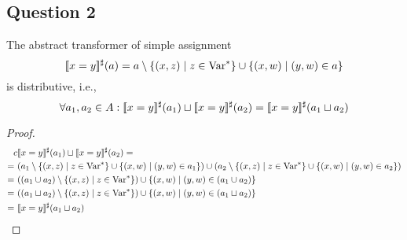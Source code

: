 \subsection{Question 2}
The abstract transformer of simple assignment
\begin{equation*}
	[\![x=y]\!]^\sharp(a) = a \setminus \{(x,z) \mid z\in \text{Var}^*\}\cup\{(x,w)\mid(y,w)\in a\}
\end{equation*}
is distributive, i.e.,
\begin{equation*}
	\forall a_1,a_2\in A: [\![x=y]\!]^\sharp(a_1)\sqcup[\![x=y]\!]^\sharp(a_2)=[\![x=y]\!]^\sharp(a_1\sqcup a_2)
\end{equation*}
\begin{proof}
\begin{align*}
c & [\![x=y]\!]^\sharp(a_1)\sqcup[\![x=y]\!]^\sharp(a_2) = \\
= \ &(a_1 \setminus \{(x,z)\mid z \in \text{Var}^*\}\cup \{(x,w)\mid(y,w)\in a_1\}) \cup (a_2 \setminus \{(x,z)\mid z \in \text{Var}^*\}\cup \{(x,w)\mid(y,w)\in a_2\}) \\
= \ &((a_1 \cup a_2) \setminus \{(x,z)\mid z \in \text{Var}^*\}) \cup \{(x,w)\mid (y,w) \in (a_1 \cup a_2)\} \\
= \ &((a_1 \sqcup a_2) \setminus \{(x,z)\mid z \in \text{Var}^*\}) \cup \{(x,w)\mid (y,w) \in (a_1 \sqcup a_2)\} \\
= \ &[\![x=y]\!]^\sharp(a_1 \sqcup a_2)
\end{align*}
\end{proof}